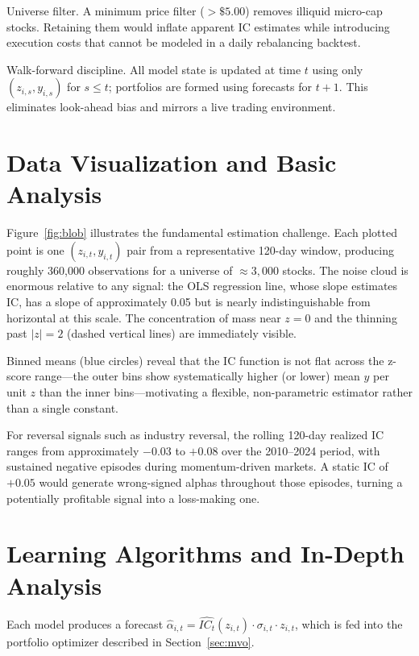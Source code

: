 \documentclass[11pt]{amsart}
\begin{document}
Universe filter.
A minimum price filter ($>\$5.00$) removes illiquid micro-cap stocks.
Retaining them would inflate apparent IC estimates while introducing
execution costs that cannot be modeled in a daily rebalancing backtest.

Walk-forward discipline.
All model state is updated at time $t$ using only $(z_{i,s}, y_{i,s})$ for
$s \leq t$; portfolios are formed using forecasts for $t+1$.  This
eliminates look-ahead bias and mirrors a live trading environment.

\section{Data Visualization and Basic Analysis}

Figure~\ref{fig:blob} illustrates the fundamental estimation challenge.
Each plotted point is one $(z_{i,t}, y_{i,t})$ pair from a representative
120-day window, producing roughly 360{,}000 observations for a universe of
$\approx 3{,}000$ stocks.  The noise cloud is enormous relative to any
signal: the OLS regression line, whose slope estimates IC, has a slope of
approximately 0.05 but is nearly indistinguishable from horizontal at this
scale.  The concentration of mass near $z = 0$ and the thinning past
$|z| = 2$ (dashed vertical lines) are immediately visible.

Binned means (blue circles) reveal that the IC function is not flat across
the z-score range---the outer bins show systematically higher (or lower)
mean $y$ per unit $z$ than the inner bins---motivating a flexible,
non-parametric estimator rather than a single constant.

For reversal signals such as industry reversal, the rolling 120-day realized
IC ranges from approximately $-0.03$ to $+0.08$ over the 2010--2024 period,
with sustained negative episodes during momentum-driven markets.  A static
IC of $+0.05$ would generate wrong-signed alphas throughout those episodes,
turning a potentially profitable signal into a loss-making one.


\section{Learning Algorithms and In-Depth Analysis}

Each model produces a forecast
$\hat{\alpha}_{i,t} = \widehat{IC_t}(z_{i,t}) \cdot \sigma_{i,t} \cdot z_{i,t}$,
which is fed into the portfolio optimizer described in
Section~\ref{sec:mvo}.
\end{document}
